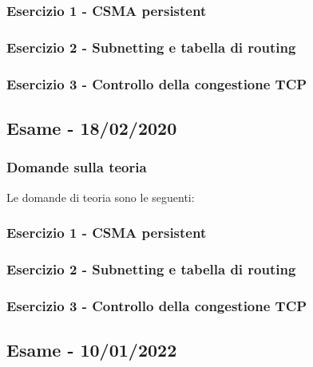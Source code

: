 \documentclass[a4paper]{article}
\begin{document}
	\subsubsection{Esercizio 1 - CSMA persistent}
	
	\subsubsection{Esercizio 2 - Subnetting e tabella di routing}
	
	\subsubsection{Esercizio 3 - Controllo della congestione TCP}
	
	\newpage

	\subsection[\textbf{Esame - 18/02/2020}]{Esame - 18/02/2020}
	
	\subsubsection{Domande sulla teoria}
	Le domande di teoria sono le seguenti:
	
	\subsubsection{Esercizio 1 - CSMA persistent}
	
	\subsubsection{Esercizio 2 - Subnetting e tabella di routing}
	
	\subsubsection{Esercizio 3 - Controllo della congestione TCP}
	
	\newpage

	\subsection[\textbf{Esame - 10/01/2022}]{Esame - 10/01/2022}
	
\end{document}
